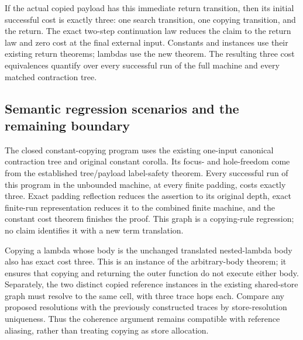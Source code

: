 
If the actual copied payload has this immediate return transition, then its
initial successful cost is exactly three: one search transition, one copying
transition, and the return. The exact two-step continuation law reduces the
claim to the return law and zero cost at the final external input. Constants
and instances use their existing return theorems; lambdas use the new theorem.
The resulting three cost equivalences quantify over every successful run of
the full machine and every matched contraction tree.





\subsection{Semantic regression scenarios and the remaining boundary}

The closed constant-copying program uses the existing one-input canonical
contraction tree and original constant corolla. Its focus- and hole-freedom
come from the established tree/payload label-safety theorem. Every successful
run of this program in the unbounded machine, at every finite padding, costs
exactly three. Exact padding reflection reduces the assertion to its original
depth, exact finite-run representation reduces it to the combined finite
machine, and the constant cost theorem finishes the proof. This graph is a
copying-rule regression; no claim identifies it with a new term translation.



Copying a lambda whose body is the unchanged translated nested-lambda body
also has exact cost three. This is an instance of the arbitrary-body theorem;
it ensures that copying and returning the outer function do not execute either
body. Separately, the two distinct copied reference instances in the existing
shared-store graph must resolve to the same cell, with three trace hops each.
Compare any proposed resolutions with the previously constructed traces by
store-resolution uniqueness. Thus the coherence argument remains compatible
with reference aliasing, rather than treating copying as store allocation.

